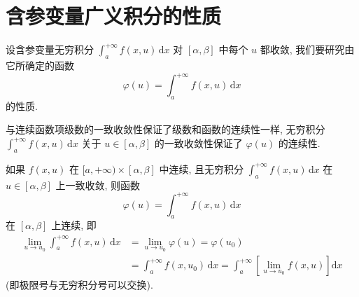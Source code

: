 \section{含参变量广义积分的性质}\label{sec:15.3}

设含参变量无穷积分 $\displaystyle\int_{a}^{+\infty}f(x,u)\,\mathrm{d}x$ 对 $[\alpha,\beta]$ 中每个 $u$ 都收敛, 我们要研究由它所确定的函数
\[
  \varphi(u)=\int_{a}^{+\infty}f(x,u)\,\mathrm{d}x
\]
的性质.

与连续函数项级数的一致收敛性保证了级数和函数的连续性一样, 无穷积分 $\displaystyle\int_{a}^{+\infty}f(x,u)\,\mathrm{d}x$ 关于 $u\in[\alpha,\beta]$ 的一致收敛性保证了 $\varphi(u)$ 的连续性.

\begin{theorem}[含参变量无穷积分保持连续性]\label{thm:15.3.1}
如果 $f(x,u)$ 在 $[a,+\infty)\times[\alpha,\beta]$ 中连续, 且无穷积分 $\displaystyle\int_{a}^{+\infty}f(x,u)\,\mathrm{d}x$ 在 $u\in[\alpha,\beta]$ 上一致收敛, 则函数
\[
  \varphi(u)=\int_{a}^{+\infty}f(x,u)\,\mathrm{d}x
\]
在 $[\alpha,\beta]$ 上连续, 即
\[
  \begin{aligned}
    \lim_{u\to u_{0}}\int_{a}^{+\infty}f(x,u)\,\mathrm{d}x&=\lim_{u\to u_{0}}\varphi(u)=\varphi(u_{0})\\
    &=\int_{a}^{+\infty}f(x,u_{0})\,\mathrm{d}x=\int_{a}^{+\infty}\left[\lim_{u\to u_{0}}f(x,u)\right]\mathrm{d}x
  \end{aligned}
\]
(即极限号与无穷积分号可以交换).
\end{theorem}

